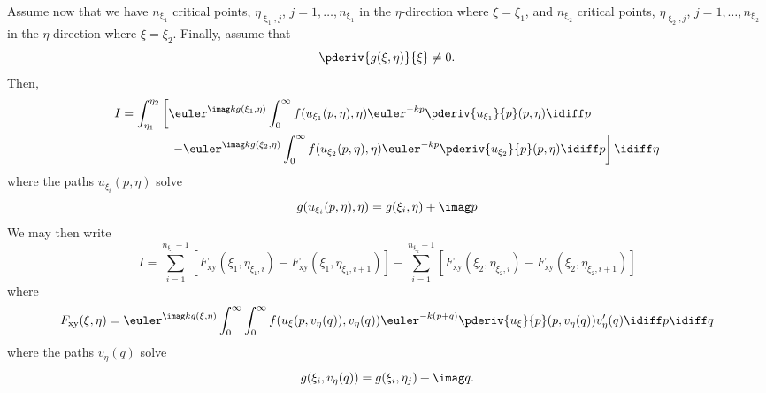 Assume now that we have $n_{\upxi_1}$ critical points, $\eta_{\upxi_1,j}$, $j=1,\dots,n_{\upxi_1}$ in the $\eta$-direction where $\xi=\xi_1$, and $n_{\upxi_2}$ critical points, $\eta_{\upxi_2,j}$, $j=1,\dots,n_{\upxi_2}$ in the $\eta$-direction where $\xi=\xi_2$. Finally, assume that
\begin{equation*}
	\pderiv{g(\xi,\eta)}{\xi}\neq 0.
\end{equation*}
Then,
\begin{align*}
	I &= \int_{\eta_1}^{\eta_2}\left[\euler^{\imag k g(\xi_1,\eta)}\int_0^\infty f(u_{\xi_1}(p,\eta),\eta)\euler^{-k p}\pderiv{u_{\xi_1}}{p}(p,\eta)\idiff p\right.\\
	&{\hskip4em\relax}\left. -\euler^{\imag k g(\xi_2,\eta)}\int_0^\infty f(u_{\xi_2}(p,\eta),\eta)\euler^{-k p}\pderiv{u_{\xi_2}}{p}(p,\eta)\idiff p\right]\idiff \eta
\end{align*}
where the paths $u_{\xi_i}(p,\eta)$ solve
\begin{equation*}
	g(u_{\xi_i}(p,\eta),\eta) = g(\xi_i,\eta) + \imag p
\end{equation*}
We may then write
\begin{equation*}
	I = \sum_{i=1}^{n_{\upxi_1}-1} [F_{\mathrm{xy}}(\xi_1,\eta_{\xi_1,i}) - F_{\mathrm{xy}}(\xi_1,\eta_{\xi_1,i+1})] - \sum_{i=1}^{n_{\upxi_2}-1} [F_{\mathrm{xy}}(\xi_2,\eta_{\xi_2,i}) - F_{\mathrm{xy}}(\xi_2,\eta_{\xi_2,i+1})]
\end{equation*}
where
\begin{equation*}
	F_{\mathrm{xy}}(\xi,\eta) = \euler^{\imag k g(\xi,\eta)}\int_0^\infty\int_0^\infty f(u_{\xi}(p,v_{\eta}(q)),v_{\eta}(q))\euler^{-k (p+q)}\pderiv{u_{\xi}}{p}(p,v_{\eta}(q))v_{\eta}'(q)\idiff p\idiff q
\end{equation*}
where the paths $v_{\eta}(q)$ solve
\begin{equation*}
	g(\xi_i, v_{\eta}(q)) = g(\xi_i,\eta_j) + \imag q.
\end{equation*}
